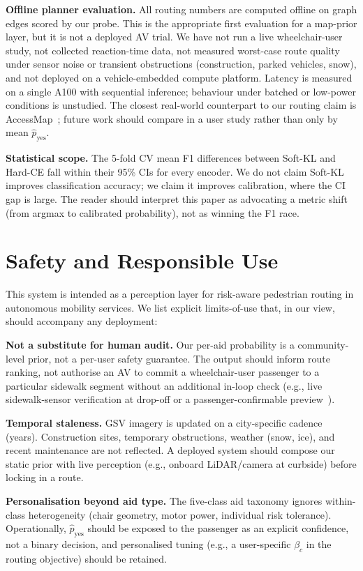 \documentclass[conference]{IEEEtran}
\begin{document}
\textbf{Offline planner evaluation.} All routing numbers are computed offline on graph edges scored by our probe. This is the appropriate first evaluation for a map-prior layer, but it is not a deployed AV trial. We have not run a live wheelchair-user study, not collected reaction-time data, not measured worst-case route quality under sensor noise or transient obstructions (construction, parked vehicles, snow), and not deployed on a vehicle-embedded compute platform. Latency is measured on a single A100 with sequential inference; behaviour under batched or low-power conditions is unstudied. The closest real-world counterpart to our routing claim is AccessMap~\cite{bolten2017accessmap}; future work should compare in a user study rather than only by mean $\hat{p}_\mathrm{yes}$.

\textbf{Statistical scope.} The 5-fold CV mean F1 differences between Soft-KL and Hard-CE fall within their 95\% CIs for every encoder. We do not claim Soft-KL improves classification accuracy; we claim it improves calibration, where the CI gap is large. The reader should interpret this paper as advocating a metric shift (from argmax to calibrated probability), not as winning the F1 race.

\FloatBarrier
\section{Safety and Responsible Use}
\label{sec:safety}

This system is intended as a perception layer for risk-aware pedestrian routing in autonomous mobility services. We list explicit limits-of-use that, in our view, should accompany any deployment:

\textbf{Not a substitute for human audit.} Our per-aid probability is a community-level prior, not a per-user safety guarantee. The output should inform route ranking, not authorise an AV to commit a wheelchair-user passenger to a particular sidewalk segment without an additional in-loop check (e.g., live sidewalk-sensor verification at drop-off or a passenger-confirmable preview~\cite{saha2022mypath}).

\textbf{Temporal staleness.} GSV imagery is updated on a city-specific cadence (years). Construction sites, temporary obstructions, weather (snow, ice), and recent maintenance are not reflected. A deployed system should compose our static prior with live perception (e.g., onboard LiDAR/camera at curbside) before locking in a route.

\textbf{Personalisation beyond aid type.} The five-class aid taxonomy ignores within-class heterogeneity (chair geometry, motor power, individual risk tolerance). Operationally, $\hat{p}_\mathrm{yes}$ should be exposed to the passenger as an explicit confidence, not a binary decision, and personalised tuning (e.g., a user-specific $\beta_c$ in the routing objective) should be retained.
\end{document}
